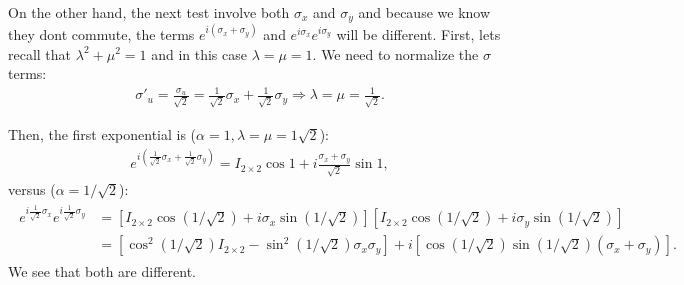 \documentclass[letterpaper,11pt,twoside]{article}
\begin{document}
On the other hand, the next test involve both $\sigma_x$ and $\sigma_y$ and because we know they 
dont commute, the terms $e^{i(\sigma_x+\sigma_y)}$ and $e^{i\sigma_x}e^{i\sigma_y}$ will be different.
First, lets recall that $\lambda^2+\mu^2=1$ and in this case $\lambda=\mu=1$. We need to normalize the $\sigma$ terms:
\begin{align*}
  \sigma'_u=\frac{\sigma_u}{\sqrt{2}}=\frac{1}{\sqrt{2}}\sigma_x+\frac{1}{\sqrt{2}}\sigma_y\Longrightarrow\lambda=\mu=\frac{1}{\sqrt{2}}.
\end{align*}

Then, the first exponential is ($\alpha=1,\lambda=\mu=1\sqrt{2}$):
\begin{align*}
  e^{i(\frac{1}{\sqrt{2}}\sigma_x+\frac{1}{\sqrt{2}}\sigma_y)}=I_{2\times2}\cos1+i\frac{\sigma_x+\sigma_y}{\sqrt{2}}\sin1,
\end{align*}
versus ($\alpha=1/\sqrt{2}$):
\begin{align*}
  \begin{array}{rl}
    e^{i\frac{1}{\sqrt{2}}\sigma_x}e^{i\frac{1}{\sqrt{2}}\sigma_y}&=[I_{2\times2}\cos(1/\sqrt{2})+i\sigma_x\sin(1/\sqrt{2})][I_{2\times2}\cos(1/\sqrt{2})+i\sigma_y\sin(1/\sqrt{2})]\\
    &=\left[\cos^2(1/\sqrt{2})I_{2\times2}-\sin^2(1/\sqrt{2})\sigma_x\sigma_y\right]+i\left[\cos(1/\sqrt{2})\sin(1/\sqrt{2})(\sigma_x+\sigma_y)\right].
  \end{array}
\end{align*}
We see that both are different.

%
\end{document}
